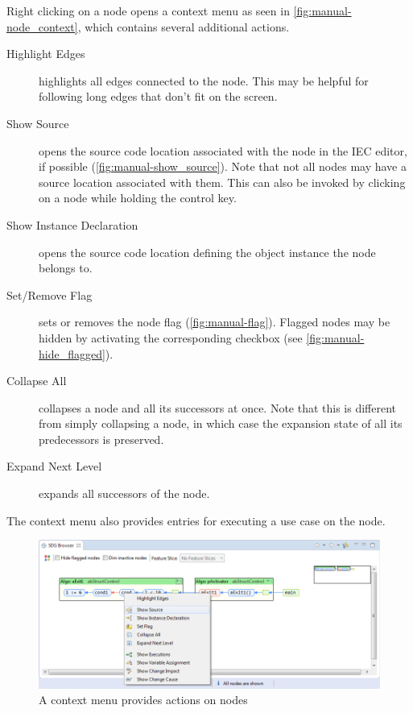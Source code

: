 Right clicking on a node opens a context menu as seen in \autoref{fig:manual-node_context}, which contains several 
additional actions.

\begin{description}
  \item[Highlight Edges] highlights all edges connected to the node. This may be   helpful for following long edges 
  that don't fit on the screen.
  
  \item[Show Source] opens the source code location associated with the node in the IEC editor, if possible 
  (\autoref{fig:manual-show_source}). Note that not all nodes may have a source location associated with them. This can 
  also be invoked by clicking on a node while holding the control key.
  
  \item[Show Instance Declaration] opens the source code location defining the object instance the node belongs to.
  
  \item[Set/Remove Flag] sets or removes the node flag (\autoref{fig:manual-flag}). Flagged nodes may be hidden by 
  activating the corresponding checkbox (see \autoref{fig:manual-hide_flagged}).
  
  \item[Collapse All] collapses a node and all its successors at once. Note that this is different from simply 
  collapsing a node, in which case the expansion state of all its predecessors is preserved.
  
  \item[Expand Next Level] expands all successors of the node.
\end{description}

The context menu also provides entries for executing a use case on the node.

\begin{figure}[p]
  \centering
    \includegraphics[width=\textwidth]{bilder/manual-node_context}
  \caption{A context menu provides actions on nodes}
  \label{fig:manual-node_context}
\end{figure}

